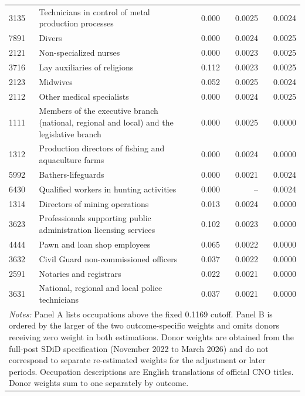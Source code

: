 \begin{longtable}{p{}>{\raggedright\arraybackslash}p{}rrr}
3135 & Technicians in control of metal production processes & 0.000 & 0.0025 & 0.0024 \\
7891 & Divers & 0.000 & 0.0024 & 0.0025 \\
2121 & Non-specialized nurses & 0.000 & 0.0023 & 0.0025 \\
3716 & Lay auxiliaries of religions & 0.112 & 0.0023 & 0.0025 \\
2123 & Midwives & 0.052 & 0.0025 & 0.0024 \\
2112 & Other medical specialists & 0.000 & 0.0024 & 0.0025 \\
1111 & Members of the executive branch (national, regional and local) and the legislative branch & 0.000 & 0.0025 & 0.0000 \\
1312 & Production directors of fishing and aquaculture farms & 0.000 & 0.0024 & 0.0000 \\
5992 & Bathers-lifeguards & 0.000 & 0.0021 & 0.0024 \\
6430 & Qualified workers in hunting activities & 0.000 & -- & 0.0024 \\
1314 & Directors of mining operations & 0.013 & 0.0024 & 0.0000 \\
3623 & Professionals supporting public administration licensing services & 0.102 & 0.0023 & 0.0000 \\
4444 & Pawn and loan shop employees & 0.065 & 0.0022 & 0.0000 \\
3632 & Civil Guard non-commissioned officers & 0.037 & 0.0022 & 0.0000 \\
2591 & Notaries and registrars & 0.022 & 0.0021 & 0.0000 \\
3631 & National, regional and local police technicians & 0.037 & 0.0021 & 0.0000 \\
\midrule
\multicolumn{5}{p{0.93\textwidth}}{\footnotesize \emph{Notes:} Panel A lists occupations above the fixed 0.1169 cutoff. Panel B is ordered by the larger of the two outcome-specific weights and omits donors receiving zero weight in both estimations. Donor weights are obtained from the full-post SDiD specification (November 2022 to March 2026) and do not correspond to separate re-estimated weights for the adjustment or later periods. Occupation descriptions are English translations of official CNO titles. Donor weights sum to one separately by outcome.} \\
\bottomrule
\end{longtable}
\normalsize
\endgroup
